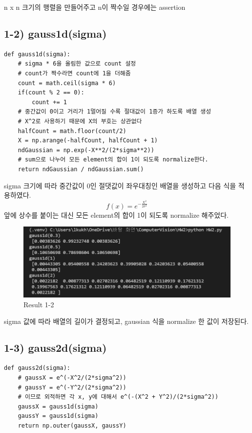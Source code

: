\documentclass[]{report}
\begin{document}
n x n 크기의 행렬을 만들어주고 n이 짝수일 경우에는 assertion \\

\subsection*{1-2) gauss1d(sigma)}

\begin{lstlisting}
def gauss1d(sigma):
	# sigma * 6을 올림한 값으로 count 설정
	# count가 짝수라면 count에 1을 더해줌
	count = math.ceil(sigma * 6)
	if(count % 2 == 0):
		count += 1
	# 중간값이 0이고 거리가 1멀어질 수록 절대값이 1증가 하도록 배열 생성
	# X^2로 사용하기 때문에 X의 부호는 상관없다
	halfCount = math.floor(count/2)
	X = np.arange(-halfCount, halfCount + 1)
	ndGaussian = np.exp(-X**2/(2*sigma**2))
	# sum으로 나누어 모든 element의 합이 1이 되도록 normalize한다.
	return ndGaussian / ndGaussian.sum()
\end{lstlisting}
sigma 크기에 따라 중간값이 0인 절댓값이 좌우대칭인 배열을 생성하고 다음 식을 적용하였다. 
\[ f(x) = e^{-\frac{X^2}{2\sigma^2}} \] 
앞에 상수를 붙이는 대신 모든 element의 합이 1이 되도록 normalize 해주었다. \\

\begin{figure}[ht!]
	\centering
	\includegraphics[width=1\textwidth]{image/result_1-2.png}
	\caption{Result 1-2}
	\label{result1_2}
\end{figure}

sigma 값에 따라 배열의 길이가 결정되고, gaussian 식을 normalize 한 값이 저장된다. \\

\subsection*{1-3) gauss2d(sigma)}
\begin{lstlisting}
def gauss2d(sigma):
	# gaussX = e^(-X^2/(2*sigma^2))
	# gaussY = e^(-Y^2/(2*sigma^2))
	# 이므로 외적하면 각 x, y에 대해서 e^(-(X^2 + Y^2)/(2*sigma^2))
	gaussX = gauss1d(sigma)
	gaussY = gauss1d(sigma)
	return np.outer(gaussX, gaussY)
\end{lstlisting}
\end{document}
